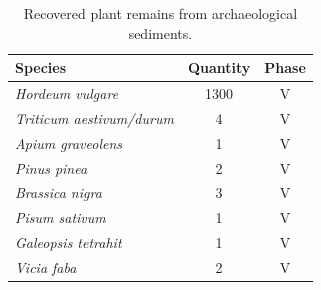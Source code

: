 \documentclass[review]{elsarticle} %
\begin{document}
\begin{table}[!h]

\caption{\label{tab:table2}Recovered plant remains from archaeological sediments.}
\centering
\fontsize{7.5}{9.5}\selectfont
\begin{tabular}[t]{>{}lcc}
\toprule
Species & Quantity & Phase\\
\midrule
\em{Hordeum vulgare} & 1300 & V\\
\em{Triticum aestivum/durum} & 4 & V\\
\em{Apium graveolens} & 1 & V\\
\em{Pinus pinea} & 2 & V\\
\em{Brassica nigra} & 3 & V\\
\em{Pisum sativum} & 1 & V\\
\em{Galeopsis tetrahit} & 1 & V\\
\em{Vicia faba} & 2 & V\\
\bottomrule
\end{tabular}
\end{table}
\end{document}
